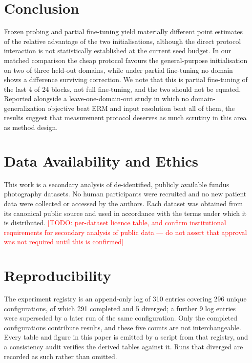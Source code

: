 \documentclass[journal]{IEEEtran}
\newcommand{\todo}[1]{\textcolor{red}{[TODO: #1]}}
\begin{document}
\section{Conclusion}
Frozen probing and partial fine-tuning yield materially different point
estimates of the relative advantage of the two initialisations, although the
direct protocol interaction is not statistically established at the current
seed budget. In our matched comparison the cheap protocol favours the
general-purpose initialisation on two of three held-out domains, while under
partial fine-tuning no domain shows a difference surviving correction. We note
that this is partial fine-tuning of the last 4 of 24 blocks, not full
fine-tuning, and the two should not be equated. Reported alongside a leave-one-domain-out
study in which no domain-generalization objective beat ERM and input resolution
beat all of them, the results suggest that measurement protocol deserves as much
scrutiny in this area as method design.

\section*{Data Availability and Ethics}
This work is a secondary analysis of de-identified, publicly available fundus
photography datasets. No human participants were recruited and no new patient
data were collected or accessed by the authors. Each dataset was obtained from
its canonical public source and used in accordance with the terms under which
it is distributed. \todo{per-dataset licence table, and confirm institutional
requirements for secondary analysis of public data --- do not assert that
approval was not required until this is confirmed}

\section*{Reproducibility}
The experiment registry is an append-only log of \num{310} entries covering
\num{296} unique configurations, of which \num{291} completed and \num{5}
diverged; a further \num{9} log entries were superseded by a later run of the
same configuration. Only the completed configurations contribute results, and
these five counts are not interchangeable. Every
table and figure in this paper is emitted by a script from that registry, and a
consistency audit verifies the derived tables against it. Runs that diverged are
recorded as such rather than omitted.



\end{document}
